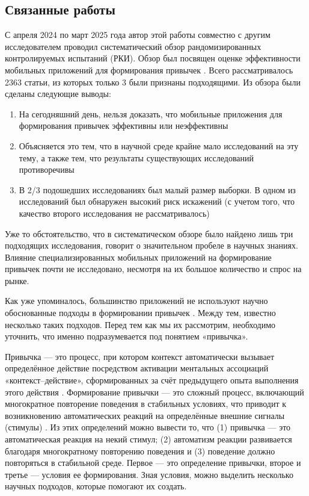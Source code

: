 \documentclass[pdflatex,sn-mathphys-num]{sn-jnl}%
\theoremstyle{thmstyleone}%
\theoremstyle{thmstyletwo}%
\theoremstyle{thmstylethree}%
\begin{document}
\subsection{Связанные работы}\label{Related Works}

С апреля 2024 по март 2025 года автор этой работы совместно с другим исследователем проводил систематический обзор рандомизированных контролируемых испытаний (РКИ). Обзор был посвящен оценке эффективности мобильных приложений для формирования привычек \cite{dementyev_impact_2025}. Всего рассматривалось 2363 статьи, из которых только 3 были признаны подходящими. Из обзора были сделаны следующие выводы:

\begin{enumerate}
    \item На сегодняшний день, нельзя доказать, что мобильные приложения для формирования привычек эффективны или неэффективны
    \item Объясняется это тем, что в научной среде крайне мало исследований на эту тему, а также тем, что результаты существующих исследований противоречивы
    \item В 2/3 подошедших исследованиях был малый размер выборки. В одном из исследований был обнаружен высокий риск искажений (с учетом того, что качество второго исследования не рассматривалось)
\end{enumerate}

Уже то обстоятельство, что в систематическом обзоре было найдено лишь три подходящих исследования, говорит о значительном пробеле в научных знаниях. Влияние специализированных мобильных приложений на формирование привычек почти не исследовано, несмотря на их большое количество и спрос на рынке.

Как уже упоминалось, большинство приложений не используют научно обоснованные подходы в формировании привычек \cite{stawarz_beyond_2015}. Между тем, известно несколько таких подходов. Перед тем как мы их рассмотрим, необходимо уточнить, что именно подразумевается под понятием «привычка».

Привычка — это процесс, при котором контекст автоматически вызывает определённое действие посредством активации ментальных ассоциаций «контекст–действие», сформированных за счёт предыдущего опыта выполнения этого действия \cite{gardner_habit_2019}. Формирование привычки — это сложный процесс, включающий многократное повторение поведения в стабильных условиях, что приводит к возникновению автоматических реакций на определённые внешние сигналы (стимулы) \cite{Lally01052013}. Из этих определений можно вывести то, что (1) привычка — это автоматическая реакция на некий стимул; (2) автоматизм реакции развивается благодаря многократному повторению поведения и (3) поведение должно повторяться в стабильной среде. Первое — это определение привычки, второе и третье — условия ее формирования. Зная условия, можно выделить несколько научных подходов, которые помогают их создать.
\end{document}
